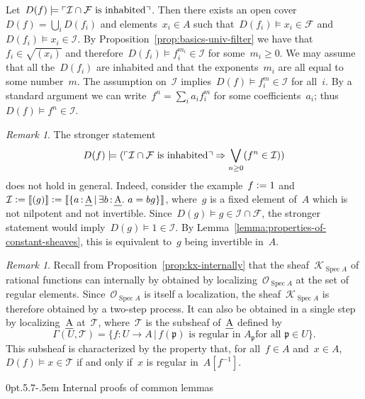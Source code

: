 \documentclass[10pt,reqno,a4paper]{amsbook}
\makeatletter
\theoremstyle{definition}
\theoremstyle{plain}
\theoremstyle{remark}
\newtheorem{rem}[defn]{Remark}
\newcommand{\F}{\mathcal{F}}
\renewcommand{\O}{\mathcal{O}}
\newcommand{\K}{\mathcal{K}}
\newcommand{\T}{\mathcal{T}}
\newcommand{\I}{\mathcal{I}}
\newcommand{\ppp}{\mathfrak{p}}
\let\oldul\ul
\renewcommand{\ul}[1]{\text{\oldul{$#1$}}}
\DeclareMathOperator{\Spec}{Spec}
\newcommand{\?}{\,{:}\,}
\renewcommand{\_}{\mathpunct{.}\,}
\newcommand{\speak}[1]{\ulcorner\text{\textnormal{#1}}\urcorner}
\newcommand{\brak}[1]{{\llbracket{#1}\rrbracket}}
\newcommand{\defeq}{\vcentcolon=}
\renewenvironment{proof}[1][\proofname]{\par
  \pushQED{\qed}%
  \normalfont \topsep6\p@\@plus6\p@\relax
  \trivlist
  \item[\hskip\labelsep
        \itshape
    #1\@addpunct{.}]\ignorespaces
}{%
  \popQED\endtrivlist\@endpefalse
}
\def\subsection{\@startsection{subsection}{2}%
  {0pt}{.5\linespacing\@plus.7\linespacing}{-.5em}%
  {\normalfont\bfseries}}
\makeatother
\begin{document}
\begin{proof}
Let~$D(f) \models \speak{$\I \cap \F$ is inhabited}$. Then there
exists an open cover~$D(f) = \bigcup_i D(f_i)$ and elements~$x_i \in A$ such
that~$D(f_i) \models x_i \in \F$ and~$D(f_i) \models x_i \in \I$. By
Proposition~\ref{prop:basics-univ-filter} we have that~$f_i \in \sqrt{(x_i)}$
and therefore~$D(f_i) \models f_i^{m_i} \in \I$ for some~$m_i \geq 0$. We may
assume that all the~$D(f_i)$ are inhabited and that the exponents~$m_i$ are all
equal to some number~$m$. The assumption on~$\I$ implies~$D(f) \models f_i^m
\in \I$ for all~$i$. By a standard argument we can write~$f^n = \sum_i a_i
f_i^m$ for some coefficients~$a_i$; thus~$D(f) \models f^n \in \I$.
\end{proof}

\begin{rem}The stronger statement
\[ D(f) \models (\speak{$\I \cap \F$ is inhabited} \Rightarrow \bigvee_{n \geq
0} (f^n \in \I)) \]
does not hold in general. Indeed, consider the example~$f \defeq 1$ and~$\I \defeq
\brak{(g)} \defeq \brak{\{ a\?\ul{A} \,|\, \exists b\?\ul{A}\_ a = bg \}}$,
where~$g$ is a fixed element of~$A$ which is not nilpotent and not invertible.
Since~$D(g) \models g \in \I \cap \F$, the stronger statement would imply~$D(g)
\models 1 \in \I$. By Lemma~\ref{lemma:properties-of-constant-sheaves}, this is
equivalent to~$g$ being invertible in~$A$.
\end{rem}

\begin{rem}Recall from Proposition~\ref{prop:kx-internally} that the
sheaf~$\K_{\Spec A}$ of rational functions can internally by obtained by
localizing~$\O_{\Spec A}$ at the set of regular elements. Since~$\O_{\Spec A}$
is itself a localization, the sheaf~$\K_{\Spec A}$ is therefore obtained by a
two-step process. It can also be obtained in a single step by
localizing~$\ul{A}$ at~$\T$, where~$\T$ is the subsheaf of~$\ul{A}$ defined
by
\[ \Gamma(U,\T) = \{ f : U \to A \,|\, \text{$f(\ppp)$ is regular in~$A_\ppp$
for all~$\ppp \in U$} \}. \]
This subsheaf is characterized by the property that, for all~$f \in A$ and~$x
\in A$,~$D(f) \models x \in \T$ if and only if~$x$ is regular in~$A[f^{-1}]$.
\end{rem}


\subsection{Internal proofs of common lemmas}
\label{sect:common-lemmas-transfer-principles}
\end{document}
